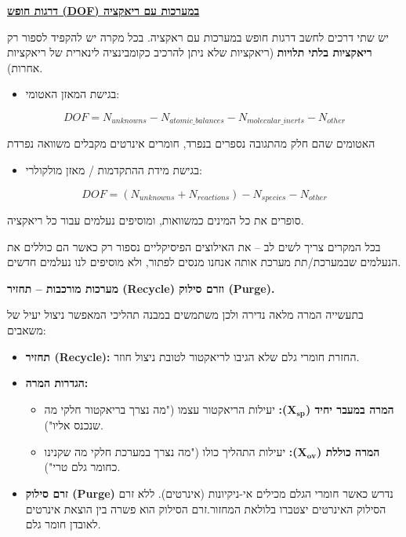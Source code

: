 \documentclass[
  hebrew,
  letterpaper,
  DIV=11,
  numbers=noendperiod]{scrreprt}
\providecommand{\tightlist}{%
  \setlength{\itemsep}{0pt}\setlength{\parskip}{0pt}}
\begin{document}
\textbf{\ul{דרגות חופש (DOF) במערכות עם ריאקציה}}

יש שתי דרכים לחשב דרגות חופש במערכות עם ראקציה. בכל מקרה יש להקפיד לספור
רק \textbf{ריאקציות בלתי תלויות} (ריאקציות שלא ניתן להרכיב כקומבינציה
לינארית של ריאקציות אחרות).

\begin{itemize}
\tightlist
\item
  בגישת המאזן האטומי:
\end{itemize}

\[DOF = N_{unknowns} - N_{atomic\text{\_}balances} - N_{molecular\text{\_}inerts} - N_{other}\]

האטומים שהם חלק מהתגובה נספרים בנפרד, חומרים אינרטים מקבלים משוואה נפרדת

\begin{itemize}
\tightlist
\item
  בגישת מידת ההתקדמות / מאזן מולקולרי:
\end{itemize}

\[DOF = \left( N_{unknowns} + N_{reactions} \right) - N_{species} - N_{other}\]

סופרים את כל המינים כמשוואות, ומוסיפים נעלמים עבור כל ריאקציה.

בכל המקרים צריך לשים לב -- את האילוצים הפיסיקליים נספור רק כאשר הם
כוללים את הנעלמים שבמערכת/תת מערכת אותה אנחנו מנסים לפתור, ולא מוסיפים
לנו נעלמים חדשים.

\textbf{מערכות מורכבות -- תחזיר (Recycle) וזרם סילוק (Purge).}

בתעשייה המרה מלאה נדירה ולכן משתמשים במבנה תהליכי המאפשר ניצול יעיל של
משאבים:

\begin{itemize}
\item
  \textbf{תחזיר (Recycle):} החזרת חומרי גלם שלא הגיבו לריאקטור לטובת
  ניצול חוזר.
\item
  \textbf{הגדרות המרה:}

  \begin{itemize}
  \item
    \textbf{המרה במעבר יחיד (}\(\mathbf{X}_{\mathbf{sp}}\)\textbf{):}
    יעילות הריאקטור עצמו ("מה נצרך בריאקטור חלקי מה שנכנס אליו").
  \item
    \textbf{המרה כוללת (}\(\mathbf{X}_{\mathbf{ov}}\)\textbf{):} יעילות
    התהליך כולו ("מה נצרך במערכת חלקי מה שקנינו כחומר גלם טרי").
  \end{itemize}
\item
  \textbf{זרם סילוק (Purge)} נדרש כאשר חומרי הגלם מכילים אי-ניקיונות
  (אינרטים). ללא זרם הסילוק האינרטים יצטברו בלולאת המחזור.זרם הסילוק הוא
  פשרה בין הוצאת אינרטים לאובדן חומר גלם.
\end{itemize}
\end{document}

